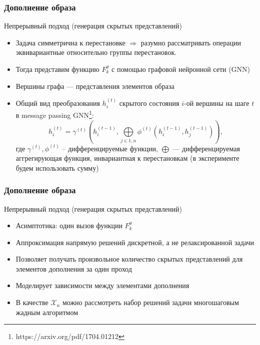 \documentclass[10pt]{beamer}
\begin{document}
\begin{frame}
	\frametitle{Дополнение образа}
	\begin{block}{Непрерывный подход (генерация скрытых представлений)}
		\begin{itemize}
			\item  Задача симметрична к перестановке $\Longrightarrow$ разумно рассматривать операции эквивариантные относительно группы перестановок.
			\item Тогда представим функцию $F_k^\theta$ с помощью графовой нейронной сети (GNN)
			\item Вершины графа --- представления элементов образа
			\item Общий вид преобразования $h_i^{(t)}$ скрытого состояния $i$-ой вершины на шаге $t$ в message passing GNN\footnote{https://arxiv.org/pdf/1704.01212}:
			$$h_i^{(t)} = \gamma^{(t)} \left(h_i^{(t-1)}, \bigoplus\limits_{j\in \overline{1, n}}\phi^{(t)} \left(h_i^{(t-1)}, h_j^{(t-1)} \right) \right),$$
			где $\gamma^{(t)}, \phi^{(t)}$ -- дифференцируемые функции, $\bigoplus$ --- дифференцируемая аггрегирующая функция, инвариантная к перестановкам (в эксперименте будем использовать сумму)
		\end{itemize}
	\end{block}
\end{frame}

\begin{frame}
	\frametitle{Дополнение образа}
	\begin{block}{Непрерывный подход (генерация скрытых представлений)}
		\begin{itemize}
			\item Асимптотика: один вызов функции $F_k^\theta$
			\item Аппроксимация напрямую решений дискретной, а не релаксированной задачи
			\item Позволяет получать произвольное количество скрытых представлений для элементов дополнения за один проход
			\item Моделирует зависимости между элементами дополнения
			\item В качестве $\mathcal{X}_n$ можно рассмотреть набор решений задачи многошаговым жадным алгоритмом
		\end{itemize}
	\end{block}
\end{frame}
\end{document}

